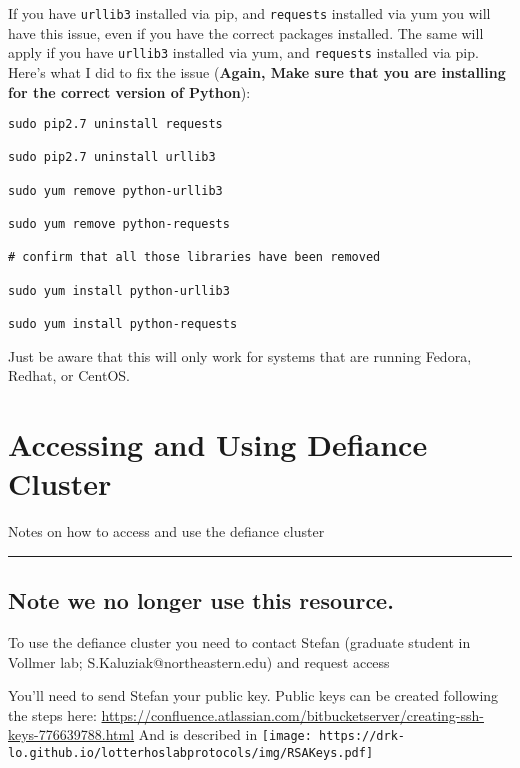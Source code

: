 \documentclass[
  letterpaper,
  DIV=11,
  numbers=noendperiod]{scrreprt}
\begin{document}
If you have \texttt{urllib3} installed via pip, and \texttt{requests}
installed via yum you will have this issue, even if you have the correct
packages installed. The same will apply if you have \texttt{urllib3}
installed via yum, and \texttt{requests} installed via pip. Here's what
I did to fix the issue (\textbf{Again, Make sure that you are installing
for the correct version of Python}):

\begin{verbatim}
sudo pip2.7 uninstall requests

sudo pip2.7 uninstall urllib3

sudo yum remove python-urllib3

sudo yum remove python-requests

# confirm that all those libraries have been removed

sudo yum install python-urllib3

sudo yum install python-requests
\end{verbatim}

Just be aware that this will only work for systems that are running
Fedora, Redhat, or CentOS.

\hypertarget{accessing-and-using-defiance-cluster}{%
\chapter{Accessing and Using Defiance
Cluster}\label{accessing-and-using-defiance-cluster}}

Notes on how to access and use the defiance cluster

\begin{center}\rule{0.5\linewidth}{0.5pt}\end{center}

\hypertarget{note-we-no-longer-use-this-resource.}{%
\section{\texorpdfstring{\textbf{Note we no longer use this
resource.}}{Note we no longer use this resource.}}\label{note-we-no-longer-use-this-resource.}}

To use the defiance cluster you need to contact Stefan (graduate student
in Vollmer lab; S.Kaluziak@northeastern.edu) and request access

You'll need to send Stefan your public key. Public keys can be created
following the steps here:
\url{https://confluence.atlassian.com/bitbucketserver/creating-ssh-keys-776639788.html}
And is described in
\texttt{[image: https://drk-lo.github.io/lotterhoslabprotocols/img/RSAKeys.pdf]}
\end{document}

